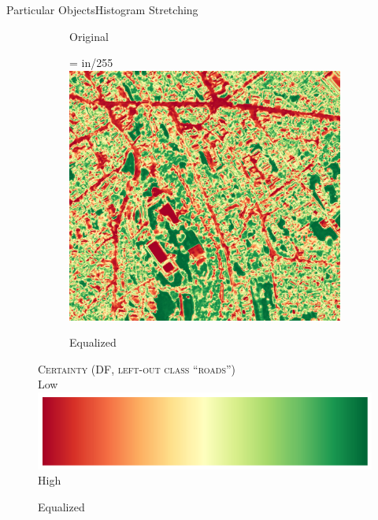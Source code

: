 \documentclass{beamer}
\newcommand{\legendCert}{\footnotesize
	Low \includegraphics[height=.8\baselineskip]{colorbar} High
}
\begin{document}
\begin{frame}{Particular Objects}{Histogram Stretching}
\begin{figure}[H]
\begin{subfigure}{.45\textwidth}
			\caption{Original}
			\label{subfig:original-im}
		\end{subfigure}
		\begin{subfigure}{.45\textwidth}
			\centering
			\pdfpxdimen= in/255\relax
			\includegraphics[clip, trim=0 23px 310px 500px, width=\textwidth]{ZH_wo_cl_1_df_im_1_eq}
			\caption{Equalized}
			\label{subfig:equalized-im}
		\end{subfigure}
		\textsc{Certainty (\acrshort{DF}, left-out class ``roads'')}\\[.2cm]
		\legendCert
	\end{figure}
\end{frame}
\end{document}
